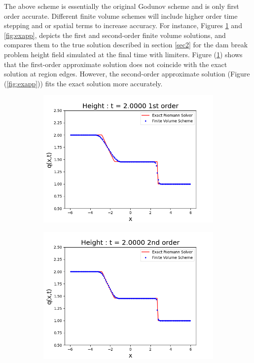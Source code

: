 \documentclass[9pt,a4paper]{article}
\newcommand{\Fig}[1]{Figure (\ref{fig:#1})}
\begin{document}
	The above  scheme is essentially the original Godunov scheme  \citep{godunov1959difference} and is only first order accurate.  Different finite volume schemes will include higher order time stepping and or spatial terms to increase accuracy.  For instance, Figures \ref{fig:exap} and \ref{fig:exapp}, depicts the first and second-order finite volume solutions, and compares them to the true solution described in section \ref{sec2} for the dam break problem height field simulated at the final time with limiters. \Fig{exap}  shows that the first-order approximate solution does not coincide with the exact solution at region edges. However, the second-order approximate solution (\Fig{exapp})  fits the exact solution more accurately. 
	\begin{figure}[H]
		\begin{subfigure}[b]{0.5\textwidth}
			\centering
			\includegraphics[width=1.0\linewidth]{images/exap}
			\caption{}
			\label{fig:exap}
		\end{subfigure}
		\begin{subfigure}[b]{0.5\textwidth}
			\centering
			\includegraphics[width=1.0\linewidth]{images/exapp}

\end{subfigure}
\end{figure}
\end{document}
